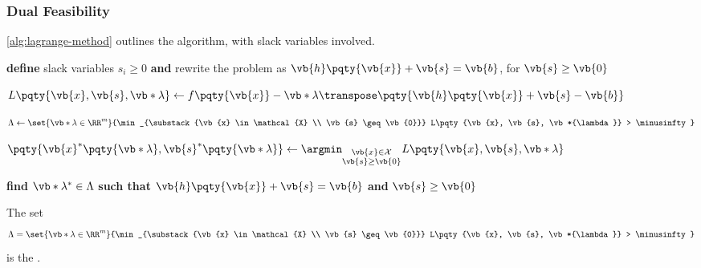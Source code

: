 \subsubsection{Dual Feasibility}

\autoref{alg:lagrange-method} outlines the algorithm, with slack variables involved.

\begin{algorithm}[ht!]
    \caption{Lagrange Method with Slack Variables}\label{alg:lagrange-method}%
    \begin{algorithmic}
        
        \State \textbf{define} slack variables \(s_i \geq 0\) \textbf{and} rewrite the problem as \(\vb{h} \pqty{\vb{x}} + \vb{s} = \vb{b}\), for \(\vb{s} \geq \vb{0}\)

        \State \(L\pqty{\vb{x}, \vb{s}, \vb*{\lambda}} \gets f\pqty{\vb{x}} - \vb*{\lambda} \transpose \pqty{\vb{h}\pqty{\vb{x}} + \vb{s} - \vb{b}}\)

        \State \(\Lambda \gets \set{\vb*{\lambda} \in \RR^m}{\min_{\substack{\vb{x} \in \mathcal{X} \\ \vb{s} \geq \vb{0}}} L\pqty{\vb{x}, \vb{s}, \vb*{\lambda}} > \minusinfty}\)

        \For{\(\vb*{\lambda} \in \Lambda\)}
            \State \(\pqty{\vb{x}^{\ast} \pqty{\vb*{\lambda}}, \vb{s}^{\ast} \pqty{\vb*{\lambda}}} \gets \argmin_{\substack{\vb{x} \in \mathcal{X} \\ \vb{s} \geq \vb{0}}} L \pqty{\vb{x}, \vb{s}, \vb*{\lambda}}\)
        \EndFor

        \State \textbf{find} \(\vb*{\lambda}^{\ast} \in \Lambda\) \textbf{such that} \(\vb{h} \pqty{\vb{x}} + \vb{s} = \vb{b}\) \textbf{and} \(\vb{s} \geq \vb{0}\)

        \State {}

        \EndFunction
    \end{algorithmic}
\end{algorithm}

\begin{definition}
    The set
    \[
        \Lambda = \set{\vb*{\lambda} \in \RR^m}{\min_{\substack{\vb{x} \in \mathcal{X} \\ \vb{s} \geq \vb{0}}} L\pqty{\vb{x}, \vb{s}, \vb*{\lambda}} > \minusinfty}
    \]
    is the .
\end{definition}

